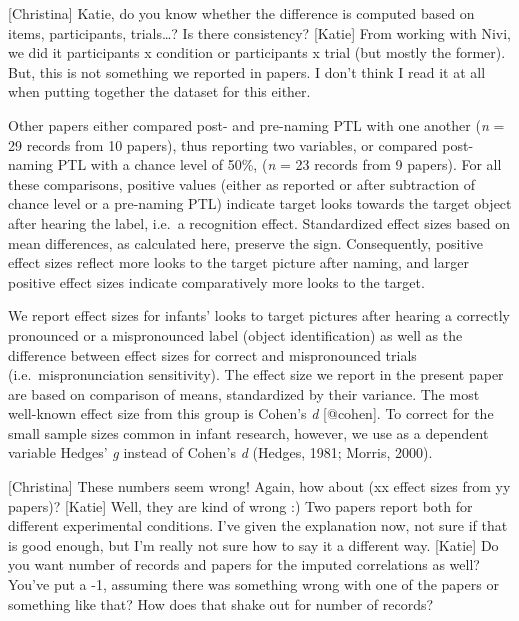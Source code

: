 \documentclass[man]{apa6}
\theoremstyle{definition}
\theoremstyle{definition}
\theoremstyle{definition}
\theoremstyle{remark}
\begin{document}
{[}Christina{]} Katie, do you know whether the difference is computed
based on items, participants, trials\ldots{}? Is there consistency?
{[}Katie{]} From working with Nivi, we did it participants x condition
or participants x trial (but mostly the former). But, this is not
something we reported in papers. I don't think I read it at all when
putting together the dataset for this either.

Other papers either compared post- and pre-naming PTL with one another
(\emph{n} = 29 records from 10 papers), thus reporting two variables, or
compared post-naming PTL with a chance level of 50\%, (\emph{n} = 23
records from 9 papers). For all these comparisons, positive values
(either as reported or after subtraction of chance level or a pre-naming
PTL) indicate target looks towards the target object after hearing the
label, i.e.~a recognition effect. Standardized effect sizes based on
mean differences, as calculated here, preserve the sign. Consequently,
positive effect sizes reflect more looks to the target picture after
naming, and larger positive effect sizes indicate comparatively more
looks to the target.

We report effect sizes for infants' looks to target pictures after
hearing a correctly pronounced or a mispronounced label (object
identification) as well as the difference between effect sizes for
correct and mispronounced trials (i.e.~mispronunciation sensitivity).
The effect size we report in the present paper are based on comparison
of means, standardized by their variance. The most well-known effect
size from this group is Cohen's \emph{d} {[}@cohen{]}. To correct for
the small sample sizes common in infant research, however, we use as a
dependent variable Hedges' \emph{g} instead of Cohen's \emph{d} (Hedges,
1981; Morris, 2000).

{[}Christina{]} These numbers seem wrong! Again, how about (xx effect
sizes from yy papers)? {[}Katie{]} Well, they are kind of wrong :) Two
papers report both for different experimental conditions. I've given the
explanation now, not sure if that is good enough, but I'm really not
sure how to say it a different way. {[}Katie{]} Do you want number of
records and papers for the imputed correlations as well? You've put a
-1, assuming there was something wrong with one of the papers or
something like that? How does that shake out for number of records?
\end{document}
